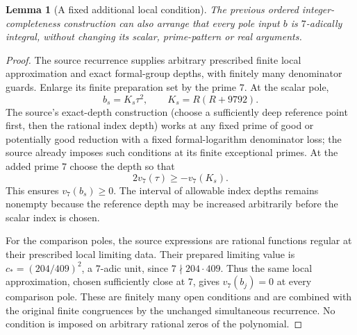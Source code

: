 \documentclass[11pt,a4paper]{article}
\newtheorem{lemma}[theorem]{Lemma}
\theoremstyle{remark}
\begin{document}
\begin{lemma}[A fixed additional local condition]
\label{lem:seven}
The previous ordered integer-completeness construction
can also arrange that every pole input $b$ is
$7$-adically integral, without changing its scalar,
prime-pattern or real arguments.
\end{lemma}
\begin{proof}
The source recurrence supplies arbitrary prescribed
finite local approximation and exact formal-group
depths, with finitely many denominator guards.
Enlarge its finite preparation set by the prime $7$.
At the scalar pole,
\[
 b_s=K_s\tau^2,\qquad K_s=R(R+9792).
\]
The source's exact-depth construction (choose a
sufficiently deep reference point first, then the
rational index depth) works at any fixed prime of
good or potentially good reduction with a fixed
formal-logarithm denominator loss; the source
already imposes such conditions at its finite
exceptional primes. At the added prime $7$ choose
the depth so that
\[
  2v_7(\tau)\ge -v_7(K_s).
\]
This ensures $v_7(b_s)\ge0$. The interval of
allowable index depths remains nonempty because
the reference depth may be increased arbitrarily
before the scalar index is chosen.

For the comparison poles, the source expressions
are rational functions regular at their prescribed
local limiting data. Their prepared limiting value
is $c_*=(204/409)^2$, a $7$-adic unit, since
$7\nmid204\cdot409$. Thus the same local
approximation, chosen sufficiently close at $7$,
gives $v_7(b_j)=0$ at every comparison pole.
These are finitely many open conditions and are
combined with the original finite congruences by
the unchanged simultaneous recurrence. No
condition is imposed on arbitrary rational zeros
of the polynomial.
\end{proof}
\end{document}
